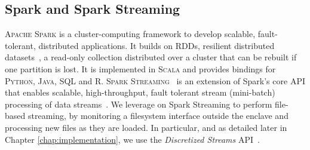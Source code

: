\subsection{Spark and Spark Streaming}
\textsc{Apache Spark} is a cluster-computing framework to develop scalable, fault-tolerant, distributed applications. 
It builds on RDDs, resilient distributed datasets~\cite{McKeen2013}, a read-only collection distributed over a cluster that can be rebuilt if one partition is lost. 
It is implemented in \textsc{Scala} and provides bindings for \textsc{Python}, \textsc{Java}, \textsc{SQL} and \textsc{R}. 
\textsc{Spark Streaming}~\cite{Zaharia2012} is an extension of Spark's core API that enables scalable, high-throughput, fault tolerant stream (mini-batch) processing of data streams~\cite{ZahariaDStreams2012}.
We leverage on Spark Streaming to perform file-based streaming, by monitoring a filesystem interface outside the enclave and processing new files as they are loaded.
In particular, and as detailed later in Chapter \ref{chap:implementation}, we use the \textit{Discretized Streams} API~\cite{spark-streaming-documentation}.

